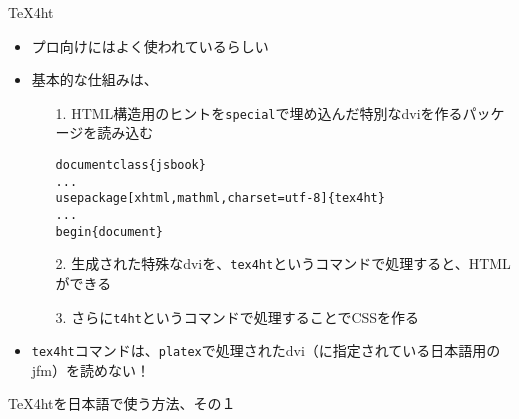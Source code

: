 \begin{frame}[containsverbatim, t]{\inhibitglue \TeX{}4ht}
  \sffamily
  
  \begin{itemize}
    \item プロ向けにはよく使われているらしい
    \item 基本的な仕組みは、\\
    \begin{itemize}
\item[\color{black}1.] HTML構造用のヒントを\texttt{{\bslash}special}で埋め込んだ特別なdviを作るパッケージを読み込む\\
    \begin{alltt}\scriptsize
{\bslash}documentclass\{jsbook\}
...
{\bslash}usepackage[xhtml,mathml,charset=utf-8]\{tex4ht\}
...
{\bslash}begin\{document\}
    \end{alltt}
\item[\color{black}2.] 生成された特殊なdviを、\texttt{tex4ht}というコマンドで処理すると、HTMLができる
\item[\color{black}3.] さらに\texttt{t4ht}というコマンドで処理することでCSSを作る
    \end{itemize}
    \item \texttt{tex4ht}コマンドは、\texttt{platex}で処理されたdvi（に指定されている日本語用のjfm）を読めない！
  \end{itemize}
\end{frame}

\begin{frame}[containsverbatim, t]{\inhibitglue \TeX{}4htを日本語で使う方法、その１}
  \sffamily
  
\end{frame}

